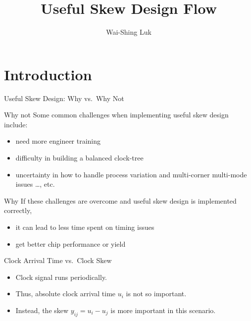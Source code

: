 \documentclass[
  ignorenonframetext,
]{beamer}
\title{Useful Skew Design Flow}
\author{Wai-Shing Luk}
\date{}
\providecommand{\tightlist}{%
  \setlength{\itemsep}{0pt}\setlength{\parskip}{0pt}}
\begin{document}
\frame{\titlepage}

\begin{frame}[allowframebreaks]
  \tableofcontents[hideallsubsections]
\end{frame}
\hypertarget{introduction}{%
\section{Introduction}\label{introduction}}

\begin{frame}{Useful Skew Design: Why vs.~Why Not}
\protect\hypertarget{sec:first}{}
\begin{block}{Why not}
\protect\hypertarget{why-not}{}
Some common challenges when implementing useful skew design include:

\begin{itemize}
\tightlist
\item
  need more engineer training
\item
  difficulty in building a balanced clock-tree
\item
  uncertainty in how to handle process variation and multi-corner
  multi-mode issues \ldots, etc.
\end{itemize}
\end{block}

\begin{block}{Why}
\protect\hypertarget{why}{}
If these challenges are overcome and useful skew design is implemented
correctly,

\begin{itemize}
\tightlist
\item
  it can lead to less time spent on timing issues
\item
  get better chip performance or yield
\end{itemize}
\end{block}
\end{frame}

\begin{frame}{Clock Arrival Time vs.~Clock Skew}
\protect\hypertarget{clock-arrival-time-vs.-clock-skew}{}
\begin{itemize}
\item
  Clock signal runs periodically.
\item
  Thus, absolute clock arrival time \(u_i\) is not so important.
\item
  Instead, the skew \(y_{ij} = u_i - u_j\) is more important in this
  scenario.
\end{itemize}
\end{frame}
\end{document}
